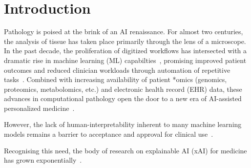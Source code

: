 \documentclass[final,5p,times,twocolumn,hyphens]{elsarticle}
\begin{document}
\section{Introduction}
\label{sec:introduction}

Pathology is poised at the brink of an AI renaissance. For almost two centuries, the analysis of tissue has taken place primarily through the lens of a microscope. In the past decade, the proliferation of digitized workflows has intersected with a dramatic rise in machine learning (ML) capabilties~\cite{Pantanowitz:2010:DigitalPathology,PantanowitzEtAl:2021:AIPatho}, promising improved patient outcomes and reduced clinician workloads through automation of repetitive tasks~\cite{das2020computer}. Combined with increasing availability of patient *omics (genomics, proteomics, metabolomics, etc.) and electronic health record (EHR) data, these advances in computational pathology open the door to a new era of AI-assisted personalized medicine~\cite{acs2020artificial,holzinger_artificial_2020}.

However, the lack of human-interpretability inherent to many machine learning models remains a barrier to acceptance and approval for clinical use~\cite{cui2021artificial}.

Recognising this need, the body of research on explainable AI (xAI) for medicine has grown exponentially~\cite{tjoa_survey_2020,poceviciute_survey_2020}. 
\end{document}
